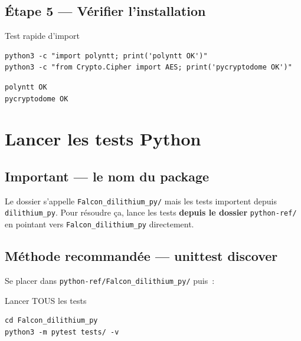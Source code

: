\documentclass[12pt, a4paper]{article}
\begin{document}
\subsection{Étape 5 — Vérifier l'installation}

\begin{cmdbox}{Test rapide d'import}
\begin{lstlisting}[style=bash]
python3 -c "import polyntt; print('polyntt OK')"
python3 -c "from Crypto.Cipher import AES; print('pycryptodome OK')"
\end{lstlisting}
\end{cmdbox}

\begin{successbox}
\begin{lstlisting}[style=output]
polyntt OK
pycryptodome OK
\end{lstlisting}
\end{successbox}

\section{Lancer les tests Python}

\subsection{Important --- le nom du package}

\begin{warningbox}
Le dossier s'appelle \texttt{Falcon\_dilithium\_py/} mais les tests importent
depuis \texttt{dilithium\_py}. Pour résoudre ça, lance les tests
\textbf{depuis le dossier} \texttt{python-ref/} en pointant vers
\texttt{Falcon\_dilithium\_py} directement.
\end{warningbox}

\subsection{Méthode recommandée --- unittest discover}

Se placer dans \texttt{python-ref/Falcon\_dilithium\_py/} puis~:

\begin{cmdbox}{Lancer TOUS les tests}
\begin{lstlisting}[style=bash]
cd Falcon_dilithium_py
python3 -m pytest tests/ -v
\end{lstlisting}
\end{cmdbox}
\end{document}
